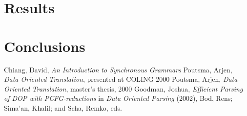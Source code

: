 \documentclass[a4paper]{article}
\theoremstyle{definition}
\begin{document}
\section{Results}

\section{Conclusions}

\begin{thebibliography}{BlAbLa00}
 Chiang, David, \emph{An Introduction to Synchronous Grammars}
 Poutsma, Arjen, \emph{Data-Oriented Translation}, presented at COLING 2000
 Poutsma, Arjen, \emph{Data-Oriented Translation}, master's thesis, 2000
 Goodman, Joshua, \emph{Efficient Parsing of DOP with PCFG-reductions} in \emph{Data Oriented Parsing} (2002), Bod, Rens; Sima'an, Khalil; and Scha, Remko, eds.
\end{thebibliography}
\end{document}
